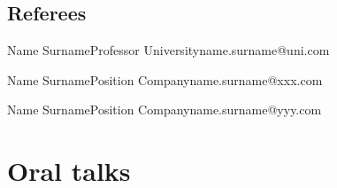 \documentclass[letterpaper, 10pt, yearbullet]{techcv}
\begin{document}
\begin{paracol}{2}
\section{Referees}
\begin{referees}
\item{Name Surname}{Professor}
    {University}{name.surname@uni.com}
\item{Name Surname}{Position}
    {Company}{name.surname@xxx.com}
\item{Name Surname}{Position}
    {Company}{name.surname@yyy.com}
\end{referees}

\end{paracol}


\newpage


\section{Oral talks}
\begin{eventlist}
\end{eventlist}


%
%

\nocite{*}
\printbibtabular[title=Publications from *.bib ]
\end{document}

